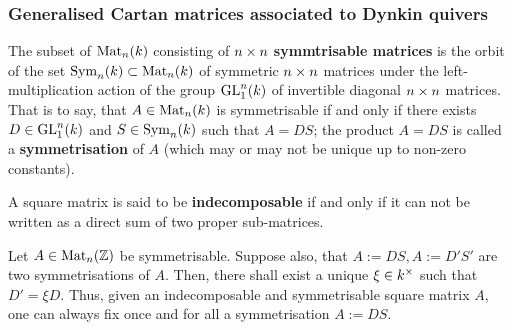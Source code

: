         \subsubsection{Generalised Cartan matrices associated to Dynkin quivers}
            \begin{definition} \label{def: symmetrisable_matrices}
                The subset of $\mathrm{Mat}_n(k)$ consisting of $n \x n$ \textbf{symmtrisable matrices} is the orbit of the set $\mathrm{Sym}_n(k) \subset \mathrm{Mat}_n(k)$ of symmetric $n \x n$ matrices under the left-multiplication action of the group $\mathrm{GL}_1^n(k)$ of invertible diagonal $n \x n$ matrices. That is to say, that $A \in \mathrm{Mat}_n(k)$ is symmetrisable if and only if there exists $D \in \mathrm{GL}_1^n(k)$ and $S \in \mathrm{Sym}_n(k)$ such that $A = DS$; the product $A = DS$ is called a \textbf{symmetrisation} of $A$ (which may or may not be unique up to non-zero constants).
            \end{definition}
            \begin{definition} \label{def: indecomposable_matrices}
                A square matrix is said to be \textbf{indecomposable} if and only if it can not be written as a direct sum of two proper sub-matrices.  
            \end{definition}
            \begin{remark} \label{remark: symmetrisations_of_indecomposable_symmetrisable_matrices}
                \cite[Corollary 15.16]{carter_affine_lie_algebras} Let $A \in \mathrm{Mat}_n(\mathbb{Z})$ be symmetrisable. Suppose also, that $A := DS, A := D'S'$ are two symmetrisations of $A$. Then, there shall exist a unique $\xi \in k^{\x}$ such that $D' = \xi D$. Thus, given an indecomposable and symmetrisable square matrix $A$, one can always fix once and for all a symmetrisation $A := DS$.
            \end{remark}
            
